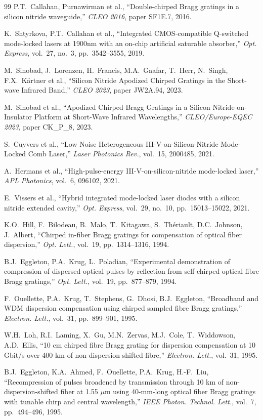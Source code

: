\documentclass[12pt,a4paper,twoside]{article}
\begin{document}
\begin{thebibliography}{99}
P.T.~Callahan, Purnawirman et al.,
``Double-chirped Bragg gratings in a silicon nitride waveguide,''
\textit{CLEO 2016}, paper SF1E.7, 2016.

K.~Shtyrkova, P.T.~Callahan et al.,
``Integrated CMOS-compatible Q-switched mode-locked lasers at 1900nm
with an on-chip artificial saturable absorber,''
\textit{Opt. Express}, vol.~27, no.~3, pp.~3542--3555, 2019.

M.~Sinobad, J.~Lorenzen, H.~Francis, M.A.~Gaafar,
T.~Herr, N.~Singh, F.X.~K\"{a}rtner et al.,
``Silicon Nitride Apodized Chirped Gratings in the Short-wave Infrared Band,''
\textit{CLEO 2023}, paper JW2A.94, 2023.

M.~Sinobad et al.,
``Apodized Chirped Bragg Gratings in a Silicon Nitride-on-Insulator Platform
at Short-Wave Infrared Wavelengths,''
\textit{CLEO/Europe-EQEC 2023}, paper CK\_P\_8, 2023.

S.~Cuyvers et al.,
``Low Noise Heterogeneous III-V-on-Silicon-Nitride Mode-Locked Comb Laser,''
\textit{Laser Photonics Rev.}, vol.~15, 2000485, 2021.

A.~Hermans et al.,
``High-pulse-energy III-V-on-silicon-nitride mode-locked laser,''
\textit{APL Photonics}, vol.~6, 096102, 2021.

E.~Vissers et al.,
``Hybrid integrated mode-locked laser diodes with a silicon nitride extended cavity,''
\textit{Opt. Express}, vol.~29, no.~10, pp.~15013--15022, 2021.

K.O.~Hill, F.~Bilodeau, B.~Malo, T.~Kitagawa,
S.~Th\'{e}riault, D.C.~Johnson, J.~Albert,
``Chirped in-fiber Bragg gratings for compensation of optical fiber dispersion,''
\textit{Opt. Lett.}, vol.~19, pp.~1314--1316, 1994.

B.J.~Eggleton, P.A.~Krug, L.~Poladian,
``Experimental demonstration of compression of dispersed optical pulses
by reflection from self-chirped optical fibre Bragg gratings,''
\textit{Opt. Lett.}, vol.~19, pp.~877--879, 1994.

F.~Ouellette, P.A.~Krug, T.~Stephens, G.~Dhosi, B.J.~Eggleton,
``Broadband and WDM dispersion compensation using chirped sampled fibre Bragg gratings,''
\textit{Electron. Lett.}, vol.~31, pp.~899--901, 1995.

W.H.~Loh, R.I.~Laming, X.~Gu, M.N.~Zervas,
M.J.~Cole, T.~Widdowson, A.D.~Ellis,
``10 cm chirped fibre Bragg grating for dispersion compensation at 10 Gbit/s
over 400 km of non-dispersion shifted fibre,''
\textit{Electron. Lett.}, vol.~31, 1995.

B.J.~Eggleton, K.A.~Ahmed, F.~Ouellette, P.A.~Krug, H.-F.~Liu,
``Recompression of pulses broadened by transmission through 10 km of
non-dispersion-shifted fiber at 1.55 $\mu$m using 40-mm-long optical fiber
Bragg gratings with tunable chirp and central wavelength,''
\textit{IEEE Photon. Technol. Lett.}, vol.~7, pp.~494--496, 1995.

\end{thebibliography}
\end{document}
